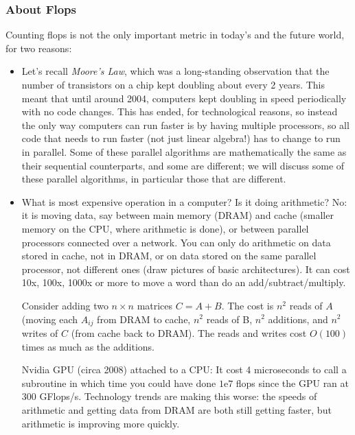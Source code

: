 \documentclass[11pt]{article}
\numberwithin{equation}{section}
\begin{document}
\subsubsection{About Flops}
Counting flops is not the only important metric in today's and the future world, for two reasons:
\begin{itemize}
    \item Let's recall \textit{Moore's Law}, which was a long-standing observation that the number of transistors on a chip kept doubling about every 2 years. 
    This meant that until around 2004, computers kept doubling in speed periodically with no code changes. This has ended, for technological reasons, 
    so instead the only way computers can run faster is by having multiple processors, so all code that needs to run faster (not just linear algebra!) 
    has to change to run in parallel. Some of these parallel algorithms are mathematically the same as their sequential counterparts, and some are different; 
    we will discuss some of these parallel algorithms, in particular those that are different.
    \item What is most expensive operation in a computer? Is it doing arithmetic? No: it is moving data, say between main memory (DRAM) and cache 
    (smaller memory on the CPU, where arithmetic is done), or between parallel processors connected over a network. 
    You can only do arithmetic on data stored in cache, not in DRAM, or on data stored on the same parallel processor, not different ones 
    (draw pictures of basic architectures).
    It can cost 10x, 100x, 1000x or more to move a word than do an add/subtract/multiply.
    \begin{example}
        Consider adding two $n \times n$ matrices $C=A+B$. The cost is $n^2$ reads of $A$ (moving each $A_{ij}$ from DRAM to cache, $n^2$ reads of B, 
        $n^2$ additions, and $n^2$ writes of $C$ (from cache back to DRAM). The reads and writes cost $O(100)$ times as much as the additions.
    \end{example}
    \begin{example}
        Nvidia GPU (circa 2008) attached to a CPU: It cost 4 microseconds to call a subroutine in which time you could have done $1\mathrm{e}7$ 
        flops since the GPU ran at 300 GFlops/s. Technology trends are making this worse: 
        the speeds of arithmetic and getting data from DRAM are both still getting faster,  but arithmetic is improving more quickly.
    \end{example}
    

\end{itemize}
\end{document}
